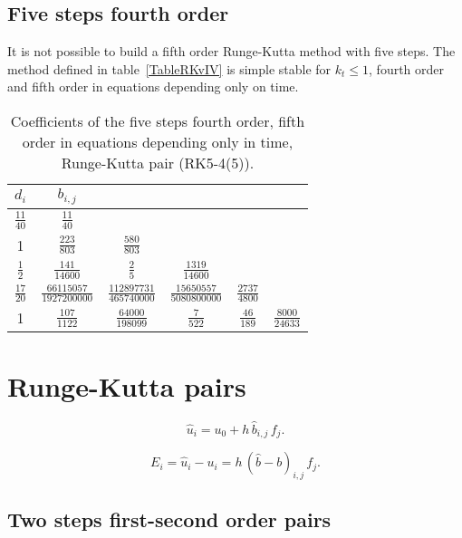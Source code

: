 \documentclass[a4paper]{article}
\newcommand{\EQ}[2]{\begin{equation}#1\label{#2}\end{equation}}
\newcommand{\PA}[1]{\left(#1\right)}
\begin{document}
\subsection{Five steps fourth order}

It is not possible to build a fifth order Runge-Kutta method with five steps.
The method defined in table~\ref{TableRKvIV} is simple stable for $k_t\leq1$,
fourth order and fifth order in equations depending only on time.
\begin{table}[ht]
	\renewcommand*{\arraystretch}{1.3}
	\centering
	\begin{tabular}{c|ccccc}
		$d_{i}$ & $b_{i,j}$ \\ \hline
		$\frac{11}{40}$ & $\frac{11}{40}$ \\
		1 & $\frac{223}{803}$ & $\frac{580}{803}$ \\
		$\frac12$ & $\frac{141}{14600}$ & $\frac25$ & $\frac{1319}{14600}$ \\
		$\frac{17}{20}$ & $\frac{66115057}{1927200000}$ & 
			$\frac{112897731}{465740000}$ & $\frac{15650557}{5080800000}$
			& $\frac{2737}{4800}$ \\
		1 & $\frac{107}{1122}$ & $\frac{64000}{198099}$ & $\frac7{522}$ & 
			$\frac{46}{189}$ & $\frac{8000}{24633}$
	\end{tabular}
	\caption{Coefficients of the five steps fourth order, fifth order in
		equations depending only in time, Runge-Kutta pair (RK5-4(5)).
		\label{TableRKIIIvIV}}
\end{table}

\section{Runge-Kutta pairs}

\EQ{\hat{u}_i=u_0+h\,\hat{b}_{i,j}\,f_j.}{EqRKpair}

\EQ{E_i=\hat{u}_i-u_i=h\,\PA{\hat{b}-b}_{i,j}\,f_j.}{EqRKpairE}

\subsection{Two steps first-second order pairs}
\end{document}
